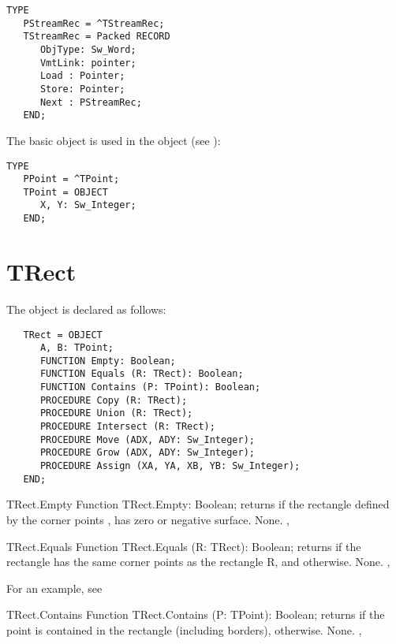 \begin{verbatim}
TYPE
   PStreamRec = ^TStreamRec;
   TStreamRec = Packed RECORD
      ObjType: Sw_Word;
      VmtLink: pointer;
      Load : Pointer;
      Store: Pointer;
      Next : PStreamRec;
   END;
\end{verbatim}

The  basic object is used in the  object (see
):
\begin{verbatim}
TYPE
   PPoint = ^TPoint;
   TPoint = OBJECT
      X, Y: Sw_Integer;
   END;
\end{verbatim}

\section{TRect}
\label{se:TRect}

The  object is declared as follows:
\begin{verbatim}
   TRect = OBJECT
      A, B: TPoint;
      FUNCTION Empty: Boolean;
      FUNCTION Equals (R: TRect): Boolean;
      FUNCTION Contains (P: TPoint): Boolean;
      PROCEDURE Copy (R: TRect);
      PROCEDURE Union (R: TRect);
      PROCEDURE Intersect (R: TRect);
      PROCEDURE Move (ADX, ADY: Sw_Integer);
      PROCEDURE Grow (ADX, ADY: Sw_Integer);
      PROCEDURE Assign (XA, YA, XB, YB: Sw_Integer);
   END;
\end{verbatim}

\begin{function}{TRect.Empty}
\Declaration
Function TRect.Empty: Boolean;
\Description
{} returns  if the rectangle defined by the corner points 
,  has zero or negative surface.
\Errors
None.
\SeeAlso
{}, 
\end{function}

\html{}

\begin{function}{TRect.Equals}      
\Declaration
Function TRect.Equals (R: TRect): Boolean;
\Description
{} returns  if the rectangle has the 
same corner points  as the rectangle R, and 
otherwise.
\Errors
None.
\SeeAlso
{}, 
\end{function}

For an example, see 

\begin{function}{TRect.Contains}
\Declaration
Function TRect.Contains (P: TPoint): Boolean;
\Description
{} returns  if the point  is contained
in the rectangle (including borders),  otherwise.
\Errors
None.
\SeeAlso
{}, 
\end{function}

